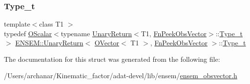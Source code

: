 \subsubsection{\texorpdfstring{Type\_t}{Type\_t}\hspace{0.1cm}{\footnotesize\ttfamily [3/3]}}
{\footnotesize\ttfamily template$<$class T1 $>$ \\
typedef \mbox{\hyperlink{classENSEM_1_1OScalar}{O\+Scalar}}$<$typename \mbox{\hyperlink{structENSEM_1_1UnaryReturn}{Unary\+Return}}$<$T1, \mbox{\hyperlink{structENSEM_1_1FnPeekObsVector}{Fn\+Peek\+Obs\+Vector}}$>$\+::\mbox{\hyperlink{structENSEM_1_1UnaryReturn_3_01OVector_3_01T1_01_4_00_01FnPeekObsVector_01_4_a389e8e049203dcaaa7ef75769364c944}{Type\+\_\+t}}$>$ \mbox{\hyperlink{structENSEM_1_1UnaryReturn}{E\+N\+S\+E\+M\+::\+Unary\+Return}}$<$ \mbox{\hyperlink{classENSEM_1_1OVector}{O\+Vector}}$<$ T1 $>$, \mbox{\hyperlink{structENSEM_1_1FnPeekObsVector}{Fn\+Peek\+Obs\+Vector}} $>$\+::\mbox{\hyperlink{structENSEM_1_1UnaryReturn_3_01OVector_3_01T1_01_4_00_01FnPeekObsVector_01_4_a389e8e049203dcaaa7ef75769364c944}{Type\+\_\+t}}}



The documentation for this struct was generated from the following file\+:\begin{DoxyCompactItemize}
\item 
/\+Users/archanar/\+Kinematic\+\_\+factor/adat-\/devel/lib/ensem/\mbox{\hyperlink{adat-devel_2lib_2ensem_2ensem__obsvector_8h}{ensem\+\_\+obsvector.\+h}}\end{DoxyCompactItemize}
